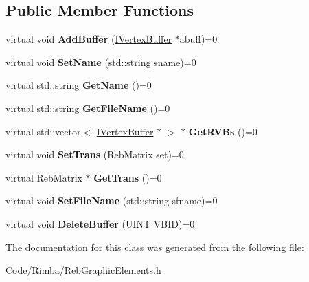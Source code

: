 \subsection*{Public Member Functions}
\begin{DoxyCompactItemize}
\item 
virtual void {\bfseries Add\+Buffer} (\hyperlink{class_i_vertex_buffer}{I\+Vertex\+Buffer} $\ast$abuff)=0\hypertarget{class_i_vertex_cache_ad74aab900cfede6e8578e5aa084a8c7b}{}\label{class_i_vertex_cache_ad74aab900cfede6e8578e5aa084a8c7b}

\item 
virtual void {\bfseries Set\+Name} (std\+::string sname)=0\hypertarget{class_i_vertex_cache_a2090b2ccdb47167ef849b05702750094}{}\label{class_i_vertex_cache_a2090b2ccdb47167ef849b05702750094}

\item 
virtual std\+::string {\bfseries Get\+Name} ()=0\hypertarget{class_i_vertex_cache_aeb63d8e35221a65ec16f32f71a7845cf}{}\label{class_i_vertex_cache_aeb63d8e35221a65ec16f32f71a7845cf}

\item 
virtual std\+::string {\bfseries Get\+File\+Name} ()=0\hypertarget{class_i_vertex_cache_ad855ca8c19730278e77069bff61bc2bb}{}\label{class_i_vertex_cache_ad855ca8c19730278e77069bff61bc2bb}

\item 
virtual std\+::vector$<$ \hyperlink{class_i_vertex_buffer}{I\+Vertex\+Buffer} $\ast$ $>$ $\ast$ {\bfseries Get\+R\+V\+Bs} ()=0\hypertarget{class_i_vertex_cache_af6cde66375db3096d66e5e643948b02c}{}\label{class_i_vertex_cache_af6cde66375db3096d66e5e643948b02c}

\item 
virtual void {\bfseries Set\+Trans} (Reb\+Matrix set)=0\hypertarget{class_i_vertex_cache_a327bdb047f2cae1c589948bcca05dd1f}{}\label{class_i_vertex_cache_a327bdb047f2cae1c589948bcca05dd1f}

\item 
virtual Reb\+Matrix $\ast$ {\bfseries Get\+Trans} ()=0\hypertarget{class_i_vertex_cache_ab0c3f7853e463997a11be180fdd2cf8f}{}\label{class_i_vertex_cache_ab0c3f7853e463997a11be180fdd2cf8f}

\item 
virtual void {\bfseries Set\+File\+Name} (std\+::string sfname)=0\hypertarget{class_i_vertex_cache_a8f09c3a581da7a403317d12312985350}{}\label{class_i_vertex_cache_a8f09c3a581da7a403317d12312985350}

\item 
virtual void {\bfseries Delete\+Buffer} (U\+I\+NT V\+B\+ID)=0\hypertarget{class_i_vertex_cache_abd31eb5c1814d1680fc0f3d69f3e363a}{}\label{class_i_vertex_cache_abd31eb5c1814d1680fc0f3d69f3e363a}

\end{DoxyCompactItemize}


The documentation for this class was generated from the following file\+:\begin{DoxyCompactItemize}
\item 
Code/\+Rimba/Reb\+Graphic\+Elements.\+h\end{DoxyCompactItemize}
